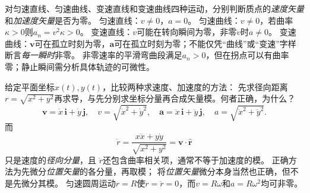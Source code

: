 \problemtext 对匀速直线、匀速曲线、变速直线和变速曲线四种运动，分别判断质点的\emph{速度矢量}和\emph{加速度矢量}是否为零。
\workings
匀速直线：$v\ne0$，$a=0$。
匀速曲线：$v\ne0$，若曲率$\kappa>0$则$a_n=v^2\kappa>0$。
变速直线：$v$可能在转向瞬间为零，非零$\dot v$时$a\ne0$。
变速曲线：$\bm v$可在孤立时刻为零，$\bm a$可在孤立时刻为零；不能仅凭“曲线”或“变速”字样断言\emph{每一瞬时}非零。
\crosscheck 非零速率的平滑弯曲段满足$a_n>0$，但在拐点可以有曲率零；静止瞬间需分析具体轨迹的可微性。

\problemtext 给定平面坐标$x(t),y(t)$，比较两种求速度、加速度的方法：
先求径向距离$r=\sqrt{x^2+y^2}$再求导，与先分别求坐标分量再合成矢量模。何者正确，为什么？
\workings
\[
\bm v=\dot x\,\bm i+\dot y\,\bm j,\quad
v=\sqrt{\dot x^2+\dot y^2},\quad
\bm a=\ddot x\,\bm i+\ddot y\,\bm j,\quad
a=\sqrt{\ddot x^2+\ddot y^2}.
\]
而
\[
\dot r=\frac{x\dot x+y\dot y}{\sqrt{x^2+y^2}}
=\bm v\cdot\hat{\bm r}
\]
只是速度的\emph{径向分量}，且
$\ddot r$还包含曲率相关项，通常不等于加速度的模。
正确方法为先微分\emph{位置矢量}的各分量，再取模；
将\emph{位置矢量}微分本身当然也正确，但不是先微分其模。
\crosscheck 匀速圆周运动$r=R$使$\dot r=\ddot r=0$，而$v=R\omega$和$a=R\omega^2$均可非零。
